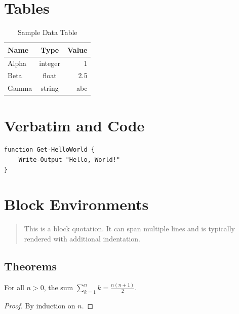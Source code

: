 \documentclass[12pt]{article}
\begin{document}
\section{Tables}

\begin{table}[h]
  \centering
  \caption{Sample Data Table}
  \label{tab:data}
  \begin{tabular}{|l|c|r|}
    \hline
    \textbf{Name} & \textbf{Type} & \textbf{Value} \\
    \hline
    Alpha   & integer & 1   \\
    Beta    & float   & 2.5 \\
    Gamma   & string  & abc \\
    \hline
  \end{tabular}
\end{table}

\section{Verbatim and Code}

\begin{verbatim}
function Get-HelloWorld {
    Write-Output "Hello, World!"
}
\end{verbatim}

\section{Block Environments}

\begin{quote}
This is a block quotation. It can span multiple lines and is typically
rendered with additional indentation.
\end{quote}

\begin{abstract}
A second abstract-style block (for demonstration purposes).
\end{abstract}

\subsection{Theorems}

\begin{theorem}
For all $n > 0$, the sum $\sum_{k=1}^{n} k = \frac{n(n+1)}{2}$.
\end{theorem}

\begin{proof}
By induction on $n$.
\end{proof}
\end{document}

